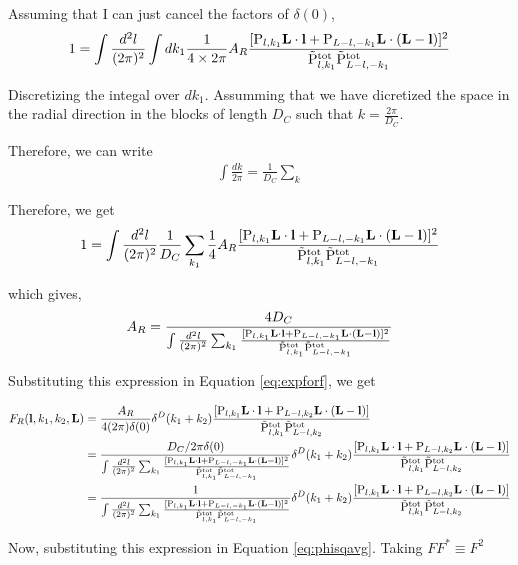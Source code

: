 \documentclass[12pt]{article}
\newcommand{\beq}{\begin{equation}}
\newcommand{\eeq}{\end{equation}}
\newcommand{\beqa}{\begin{eqnarray}}
\newcommand{\eeqa}{\end{eqnarray}}
\newcommand{\beqal}{\begin{aligned}}
\newcommand{\eeqal}{\end{aligned}}
\def\l{{\bf l}}
\def\L{{\bf L}}
\def\pul{{\rm P}}
\def\ptot{{\tilde{\rm P}^{\rm tot}}}
\def\d2l{\frac{d^2l}{(2\pi)^2}}
\numberwithin{equation}{section}
\begin{document}
Assuming that I can just cancel the factors of $ \delta(0) $, 
\beq
\beqal
1 = \int \d2l \int dk_1 \frac{1}{4\times2\pi} A_R \frac{[\pul_{l,k_1} \L\cdot \l +
	\pul_{L-l,-k_1} \L\cdot (\L-\l)]^2}{\ptot_{l,k_1}\ptot_{L-l,-k_1}} 
\eeqal
\eeq

Discretizing the integal over $ dk_1 $. Assumming that we have dicretized the space in the radial direction in the blocks of length $ D_C $ such that $ k = \frac{2\pi}{D_C} $.

Therefore, we can write 
\beqa
\int \frac{dk}{2 \pi} = \frac{1}{D_C} \sum_k
\eeqa

Therefore, we get
\beqa
1 = \int \d2l \frac{1}{D_C} \sum_{k_1} \frac{1}{4} A_R \frac{[\pul_{l,k_1} \L\cdot \l +
	\pul_{L-l,-k_1} \L\cdot (\L-\l)]^2}{\ptot_{l,k_1}\ptot_{L-l,-k_1}} 
\eeqa

which gives, 
\beqa
A_R = \frac{4 D_C}{\int \frac{d^2 l}{(2\pi)^2} \sum_{k_1} \frac{[\pul_{l,k_1} \L\cdot \l +
		\pul_{L-l,-k_1} \L\cdot (\L-\l)]^2}{\ptot_{l,k_1}\ptot_{L-l,-k_1}} }  
\eeqa

%

Substituting this expression in Equation \ref{eq:expforf}, we get

\beq
\beqal
F_R(\l,k_1,k_2,\L) &= \frac{A_R }{4 (2\pi) \delta(0) }\delta^D(k_1+k_2) \frac{[\pul_{l,k_1} \L\cdot \l +
	\pul_{L-l,k_2} \L\cdot (\L-\l)]}{\ptot_{l,k_1}\ptot_{L-l,k_2}}
\\
&=  \frac{D_C / 2\pi \delta(0)}{\int \frac{d^2 l}{(2\pi)^2} \sum_{k_1} \frac{[\pul_{l,k_1} \L\cdot \l +
		\pul_{L-l,-k_1} \L\cdot (\L-\l)]^2}{\ptot_{l,k_1}\ptot_{L-l,-k_1}} }   \delta^D(k_1+k_2) \frac{[\pul_{l,k_1} \L\cdot \l +
	\pul_{L-l,k_2} \L\cdot (\L-\l)]}{\ptot_{l,k_1}\ptot_{L-l,k_2}}\\
&=  \frac{1}{\int \frac{d^2 l}{(2\pi)^2} \sum_{k_1} \frac{[\pul_{l,k_1} \L\cdot \l +
		\pul_{L-l,-k_1} \L\cdot (\L-\l)]^2}{\ptot_{l,k_1}\ptot_{L-l,-k_1}} }   \delta^D(k_1+k_2) \frac{[\pul_{l,k_1} \L\cdot \l +
	\pul_{L-l,k_2} \L\cdot (\L-\l)]}{\ptot_{l,k_1}\ptot_{L-l,k_2}}
\eeqal
\eeq

Now, substituting this expression in Equation \ref{eq:phisqavg}. Taking $ FF^* \equiv F^2 $
\end{document}
